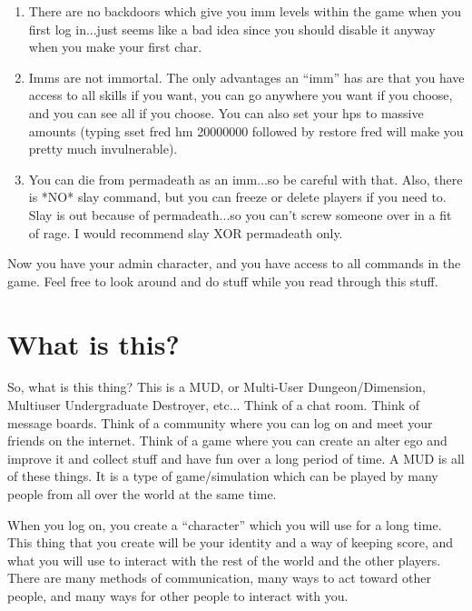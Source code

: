 \begin{enumerate}

\item There are no backdoors which give you imm levels within the game
when you first log in...just seems like a bad idea since you should
disable it anyway when you make your first char.

\item Imms are not immortal. The only advantages an ``imm'' has are
that you have access to all skills if you want, you can go anywhere
you want if you choose, and you can see all if you choose. You can
also set your hps to massive amounts (typing sset fred hm 20000000
followed by restore fred will make you pretty much invulnerable).

\item You can die from permadeath as an imm...so be careful with
that. Also, there is *NO* slay command, but you can freeze or delete
players if you need to. Slay is out because of permadeath...so you
can't screw someone over in a fit of rage. I would recommend slay XOR
permadeath only.

\end{enumerate}

Now you have your admin character, and you have access to all commands in the game. Feel free to look around and do stuff while you read through this stuff.


\section{What is this?}

So, what is this thing? This is a MUD, or Multi-User
Dungeon/Dimension, Multiuser Undergraduate Destroyer, etc... Think of
a chat room. Think of message boards. Think of a community where you
can log on and meet your friends on the internet. Think of a game
where you can create an alter ego and improve it and collect stuff and
have fun over a long period of time. A MUD is all of these things. It
is a type of game/simulation which can be played by many people from
all over the world at the same time.

When you log on, you create a ``character'' which you will use for a
long time. This thing that you create will be your identity and a way
of keeping score, and what you will use to interact with the rest of
the world and the other players. There are many methods of
communication, many ways to act toward other people, and many ways for
other people to interact with you.


